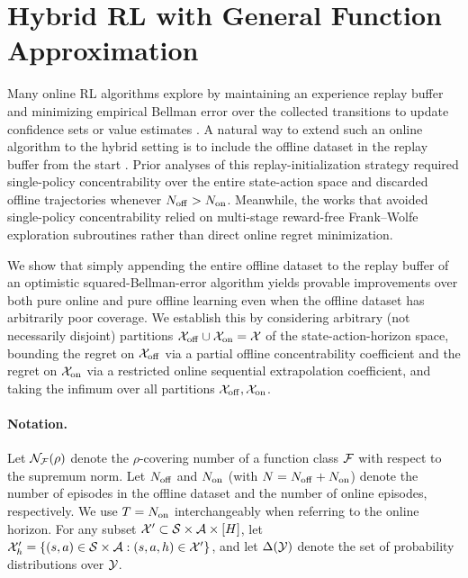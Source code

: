 
\section{Hybrid RL with General Function Approximation}
\label{sec:ch02-gfa-setup}

Many online RL algorithms explore by maintaining an experience replay buffer and minimizing empirical Bellman error over the collected transitions to update confidence sets or value estimates \citep{auer2008near, jin2021bellmaneluder, xie2022role}. A natural way to extend such an online algorithm to the hybrid setting is to include the offline dataset in the replay buffer from the start \citep{song2023hybrid, nakamoto2023calql, amortila2024harnessing}. Prior analyses of this replay-initialization strategy required single-policy concentrability over the entire state-action space and discarded offline trajectories whenever $N_{{\operatorname{off}}} > N_{{\operatorname{on}}}$. Meanwhile, the works that avoided single-policy concentrability \citep{li2023reward, wagenmaker2023leveraging} relied on multi-stage reward-free Frank--Wolfe exploration subroutines rather than direct online regret minimization.

We show that simply appending the entire offline dataset to the replay buffer of an optimistic squared-Bellman-error algorithm \citep{jin2021bellmaneluder, xie2022role} yields provable improvements over both pure online and pure offline learning even when the offline dataset has arbitrarily poor coverage. We establish this by considering arbitrary (not necessarily disjoint) partitions ${\mathcal{X}}_{{\operatorname{off}}} \cup {\mathcal{X}}_{{\operatorname{on}}} = {\mathcal{X}}$ of the state-action-horizon space, bounding the regret on ${\mathcal{X}}_{{\operatorname{off}}}$ via a partial offline concentrability coefficient and the regret on ${\mathcal{X}}_{{\operatorname{on}}}$ via a restricted online sequential extrapolation coefficient, and taking the infimum over all partitions ${\mathcal{X}}_{{\operatorname{off}}}, {\mathcal{X}}_{{\operatorname{on}}}$.

\paragraph{Notation.}
Let ${\mathcal{N}}_{{\mathcal{F}}}(\rho)$ denote the $\rho$-covering number of a function class ${\mathcal{F}}$ with respect to the supremum norm. Let $N_{{\operatorname{off}}}$ and $N_{{\operatorname{on}}}$ (with $N = N_{{\operatorname{off}}} + N_{{\operatorname{on}}}$) denote the number of episodes in the offline dataset and the number of online episodes, respectively. We use $T = N_{{\operatorname{on}}}$ interchangeably when referring to the online horizon. For any subset ${\mathcal{X}}' \subset {\mathcal{S}} \times {\mathcal{A}} \times [H]$, let ${\mathcal{X}}'_h = \{(s, a) \in {\mathcal{S}} \times {\mathcal{A}}: (s, a, h) \in {\mathcal{X}}'\}$, and let $\Delta({\mathcal{Y}})$ denote the set of probability distributions over ${\mathcal{Y}}$.

